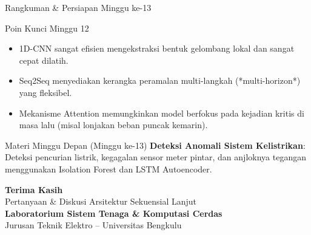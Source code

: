 \documentclass[aspectratio=169, 10pt]{beamer}
\begin{document}
\begin{frame}{Rangkuman \& Persiapan Minggu ke-13}
    \begin{block}{Poin Kunci Minggu 12}
        \begin{itemize}
            \item 1D-CNN sangat efisien mengekstraksi bentuk gelombang lokal dan sangat cepat dilatih.
            \item Seq2Seq menyediakan kerangka peramalan multi-langkah (*multi-horizon*) yang fleksibel.
            \item Mekanisme Attention memungkinkan model berfokus pada kejadian kritis di masa lalu (misal lonjakan beban puncak kemarin).
        \end{itemize}
    \end{block}
    \vspace{0.2cm}
    \begin{alertblock}{Materi Minggu Depan (Minggu ke-13)}
        \textbf{Deteksi Anomali Sistem Kelistrikan}: Deteksi pencurian listrik, kegagalan sensor meter pintar, dan anjloknya tegangan menggunakan Isolation Forest dan LSTM Autoencoder.
    \end{alertblock}
\end{frame}

\begin{frame}[plain]
    \begin{center}
        \vspace{1.5cm}
        {\Huge \color{mainblue} \textbf{Terima Kasih}}\\[0.4cm]
        {\large Pertanyaan \& Diskusi Arsitektur Sekuensial Lanjut}\\[1.2cm]
        \textbf{Laboratorium Sistem Tenaga \& Komputasi Cerdas}\\
        Jurusan Teknik Elektro -- Universitas Bengkulu
    \end{center}
\end{frame}
\end{document}
